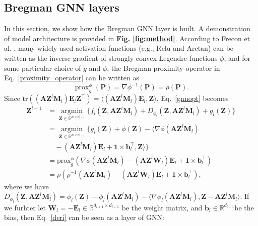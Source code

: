 \documentclass{article}
\begin{document}
\subsection{Bregman GNN layers}



In this section, we show how the Bregman GNN layer is built. A demonstration of model architecture is provided in \textbf{Fig. \ref{fig:method}}. According to Frecon et al. \cite{frecon2022bregman}, many widely used activation functions (e.g., Relu and Arctan) can be written as the inverse gradient of strongly convex Legendre functions $\phi$, and for some particular choice of $g$ and $\phi$, the Bregman proximity operator in Eq.~\eqref{proximity_operator} can be written as
$$\operatorname{prox}_g^{\phi}(\mathbf{P}) = \nabla \phi^{-1}(\mathbf{P})=\rho (\mathbf{P}) .$$
Since $\mathrm{tr}((\mathbf A \mathbf Z^l \mathbf M_l)\mathbf E_l \mathbf Z^\top)=\langle (\mathbf A \mathbf Z^l \mathbf M_l)\mathbf E_l, \mathbf Z\rangle$, Eq.~\eqref{gnnopt} becomes
\begin{equation} \label{deri}
\begin{split}
\mathbf Z^{l+1} \!\! & = \!\!\! \underset{\mathbf Z \in \mathbb{R}^{n \times d_{l+1}}}{\operatorname{argmin}}  \{ f_l(\mathbf Z, \mathbf A \mathbf Z^l \mathbf M_l) \! + \! D_{\phi_l} (\mathbf Z, \mathbf A \mathbf Z^l \mathbf M_l)\!+ \! g_l(\mathbf Z)\}\\
 & = \underset{\mathbf Z \in \mathbb{R}^{n \times d_{l+1}}}{\operatorname{argmin}} \{g_l(\mathbf Z) +\phi(\mathbf Z) - \langle \nabla \phi(\mathbf A \mathbf Z^l \mathbf M_l)\\ 
 &\quad -(\mathbf A \mathbf Z^l\mathbf M_l) \mathbf E_l+\mathbf{1} \times \mathbf b_l^\top, \mathbf Z\rangle \}\\
 & = \text{prox}_g^\phi (\nabla \phi(\mathbf A \mathbf Z^l \mathbf M_l)-(\mathbf A \mathbf Z^l \mathbf W_l) \mathbf E_l+\mathbf{1} \times \mathbf b_l^\top)\\
 & = \rho(\rho^{-1}(\mathbf A \mathbf Z^l \mathbf M_l)-(\mathbf A \mathbf Z^l \mathbf W_l) \mathbf E_l+\mathbf{1} \times \mathbf b_l^\top), 
\end{split}
\end{equation}
where we have $D_{\phi_l} (\mathbf Z, \mathbf A\mathbf Z^l \mathbf M_l)
 =\phi_l(\mathbf Z)-\phi_l(\mathbf A \mathbf Z^l \mathbf M_l)- \langle \nabla \phi_l (\mathbf A \mathbf Z^l \mathbf M_l), \mathbf Z-\mathbf A \mathbf Z^l \mathbf M_l \rangle$. If we furhter let $\mathbf W_l=-\mathbf E_l \in \mathbb{R}^{d_{l+1} \times d_{l+1}}$ be the weight matrix, and $\mathbf b_l \in \mathbb{R}^{d_{l+1}}$be the bias, then Eq.~\eqref{deri} can be seen as a layer of GNN:  
\end{document}
